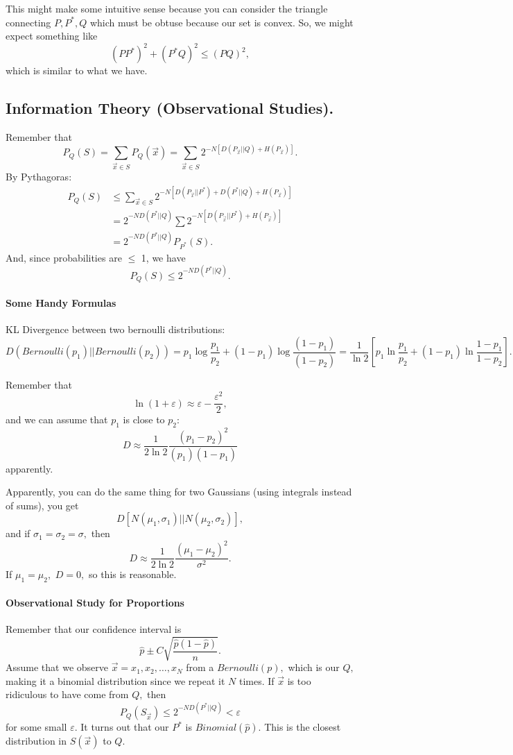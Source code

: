 \documentclass[12pt]{article}
\theoremstyle{remark}
\begin{document}
This might make some intuitive sense because you can consider the triangle connecting $P,P^\ast,Q$ which must be obtuse because our set is convex. So, we might expect something like \[(PP^\ast)^2+(P^\ast Q)^2\le (PQ)^2,\] which is similar to what we have.
\subsection{Information Theory (Observational Studies).}
Remember that
\[P_Q(S)=\sum_{\vec{x}\in S}P_Q(\vec{x})=\sum_{\vec{x}\in S}2^{-N[D(P_{\vec{x}}||Q)+H(P_{\vec{x}})]}.\]
By Pythagoras:
\begin{align*}P_Q(S)&\le\sum_{\vec{x}\in S}2^{-N[D(P_{\vec{x}}||P^\ast)+D(P^\ast||Q)+H(P_{\vec{x}})]}\\&=2^{-ND(P^\ast||Q)}\sum 2^{-N[D(P_{\vec{x}}||P^\ast)+H(P_{\vec{x}})]}\\&=2^{-ND(P^\ast||Q)}P_{P^{\ast}}(S).\end{align*}
And, since probabilities are $\le$ 1, we have
\[P_Q(S)\le 2^{-ND(P^\ast||Q)}.\]

\paragraph{Some Handy Formulas}
KL Divergence between two bernoulli distributions:
\[D(Bernoulli(p_1)||Bernoulli(p_2))=p_1\log\frac{p_1}{p_2}+(1-p_1)\log \frac{(1-p_1)}{(1-p_2)}=\frac{1}{\ln 2}\left[p_1\ln\frac{p_1}{p_2}+(1-p_1)\ln\frac{1-p_1}{1-p_2}\right].\]

Remember that \[\ln(1+\varepsilon)\approx \varepsilon-\frac{\varepsilon^2}{2},\] and we can assume that $p_1$ is close to $p_2:$
\[D\approx \frac{1}{2\ln 2}\frac{(p_1-p_2)^2}{(p_1)(1-p_1)}\] apparently.

Apparently, you can do the same thing for two Gaussians (using integrals instead of sums), you get
\[D[N(\mu_1,\sigma_1)||N(\mu_2,\sigma_2)],\] and if $\sigma_1=\sigma_2=\sigma,$
then
\[D\approx\frac{1}{2\ln 2}\frac{(\mu_1-\mu_2)^2}{\sigma^2}.\] If $\mu_1=\mu_2,$ $D=0,$ so this is reasonable.

\paragraph{Observational Study for Proportions}
Remember that our confidence interval is \[\hat{p}\pm C\sqrt{\frac{\hat p(1-\hat p)}{n}}.\] Assume that we observe $\vec{x}=x_1,x_2,\dots,x_N$ from a $Bernoulli(p),$ which is our $Q,$ making it a binomial distribution since we repeat it $N$ times. If $\vec{x}$ is too ridiculous to have come from $Q,$ then
\[P_Q(S_{\vec{x}})\le2^{-ND(P^\ast||Q)}<\varepsilon\] for some small $\varepsilon.$ It turns out that our $P^\ast$ is $Binomial(\hat p).$ This is the closest distribution in $S(\vec{x})$ to $Q.$
\end{document}
